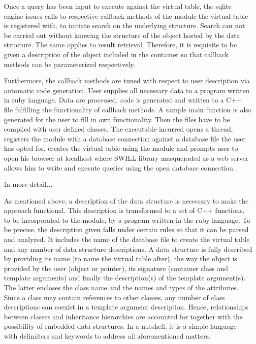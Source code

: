 \documentclass[pdftex, 11pt, a4paper]{report}
\begin{document}
\par
Once a query has been input to execute against the virtual table, the sqlite engine issues calls to respective callback methods of the module the virtual table is registered with, to initiate search on the underlying structure. Search can not be carried out without knowing the structure of the object hosted by the data structure. The same applies to result retrieval. Therefore, it is requisite to be given a description of the object included in the container so that callback methods can be parameterized respectively. 
\par
Furthermore, the callback methods are tuned with respect to user description via automatic code generation. User supplies all necessary data to a program written in ruby language. Data are processed, code is generated and written to a C++ file fulfilling the functionality of callback methods. A sample main function is also generated for the user to fill in own functionality. Then the files have to be compiled with user defined classes. The executable incurred opens a thread, registers the module with a database connection against a database file the user has opted for, creates the virtual table using the module and prompts user to open his browser at localhost where SWILL library masqueraded as a web server allows him to write and execute queries using the open database connection.
\par
In more detail...
\par
As mentioned above, a description of the data structure is necessary to make the approach functional. This description is transformed to a set of C++ functions, to be incorporated to the module, by a program written in the ruby language. To be precise, the description given falls under certain rules so that it can be parsed and analyzed. It includes the name of the database file to create the virtual table and any number of data structure descriptions. A data structure is fully described by providing its name (to name the virtual table after), the way the object is provided by the user (object or pointer), its signature (container class and template arguments) and finally the description(s) of the template argument(s). The latter encloses the class name and the names and types of the attributes. Since a class may contain references to other classes, any number of class descriptions can coexist in a template argument description. Hence, relationships between classes and inheritance hierarchies are accounted for together with the possibility of embedded data structures. In a nutshell, it is a simple language with delimiters and keywords to address all aforementioned matters.
\end{document}
